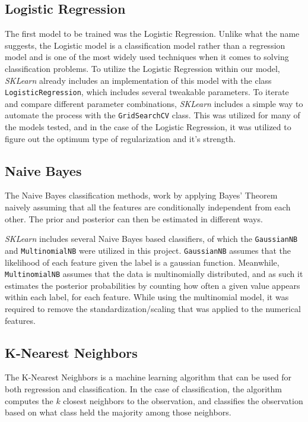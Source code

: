 \documentclass{IEEEtran}
\begin{document}
\subsection{Logistic Regression}
The first model to be trained was the Logistic Regression. Unlike what the name suggests, the Logistic model is a classification model rather than a regression model and is one of the most widely used techniques when it comes to solving classification problems. %
To utilize the Logistic Regression within our model, \textit{SKLearn} already includes an implementation of this model with the class \texttt{LogisticRegression}\cite{b7}, which includes several tweakable parameters. To iterate and compare different parameter combinations, \textit{SKLearn} includes a simple way to automate the process with the \texttt{GridSearchCV}\cite{b8} class. This was utilized for many of the models tested, and in the case of the Logistic Regression, it was utilized to figure out the optimum type of regularization and it's strength.

\subsection{Naive Bayes}

The Naive Bayes classification methods, work by applying Bayes' Theorem naively assuming that all the features are conditionally independent from each other. The prior and posterior can then be estimated in different ways.

\textit{SKLearn} includes several Naive Bayes based classifiers, of which the \texttt{GaussianNB}\cite{b9} and \texttt{MultinomialNB}\cite{b10} were utilized in this project. \texttt{GaussianNB} assumes that the likelihood of each feature given the label is a gaussian function. Meanwhile, \texttt{MultinomialNB} assumes that the data is multinomially distributed, and as such it estimates the posterior probabilities by counting how often a given value appears within each label, for each feature. While using the multinomial model, it was required to remove the standardization/scaling that was applied to the numerical features.

\subsection{K-Nearest Neighbors}

The K-Nearest Neighbors is a machine learning algorithm that can be used for both regression and classification. In the case of classification, the algorithm computes the $k$ closest neighbors to the observation, and classifies the observation based on what class held the majority among those neighbors.
\end{document}
